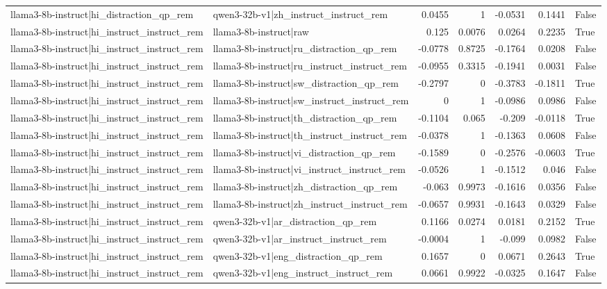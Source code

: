 \begin{table}
\begin{tabular}{l l r r r r l}
llama3-8b-instruct|hi_distraction_qp_rem & qwen3-32b-v1|zh_instruct_instruct_rem & 0.0455 & 1 & -0.0531 & 0.1441 & False \\
llama3-8b-instruct|hi_instruct_instruct_rem & llama3-8b-instruct|raw & 0.125 & 0.0076 & 0.0264 & 0.2235 & True \\
llama3-8b-instruct|hi_instruct_instruct_rem & llama3-8b-instruct|ru_distraction_qp_rem & -0.0778 & 0.8725 & -0.1764 & 0.0208 & False \\
llama3-8b-instruct|hi_instruct_instruct_rem & llama3-8b-instruct|ru_instruct_instruct_rem & -0.0955 & 0.3315 & -0.1941 & 0.0031 & False \\
llama3-8b-instruct|hi_instruct_instruct_rem & llama3-8b-instruct|sw_distraction_qp_rem & -0.2797 & 0 & -0.3783 & -0.1811 & True \\
llama3-8b-instruct|hi_instruct_instruct_rem & llama3-8b-instruct|sw_instruct_instruct_rem & 0 & 1 & -0.0986 & 0.0986 & False \\
llama3-8b-instruct|hi_instruct_instruct_rem & llama3-8b-instruct|th_distraction_qp_rem & -0.1104 & 0.065 & -0.209 & -0.0118 & True \\
llama3-8b-instruct|hi_instruct_instruct_rem & llama3-8b-instruct|th_instruct_instruct_rem & -0.0378 & 1 & -0.1363 & 0.0608 & False \\
llama3-8b-instruct|hi_instruct_instruct_rem & llama3-8b-instruct|vi_distraction_qp_rem & -0.1589 & 0 & -0.2576 & -0.0603 & True \\
llama3-8b-instruct|hi_instruct_instruct_rem & llama3-8b-instruct|vi_instruct_instruct_rem & -0.0526 & 1 & -0.1512 & 0.046 & False \\
llama3-8b-instruct|hi_instruct_instruct_rem & llama3-8b-instruct|zh_distraction_qp_rem & -0.063 & 0.9973 & -0.1616 & 0.0356 & False \\
llama3-8b-instruct|hi_instruct_instruct_rem & llama3-8b-instruct|zh_instruct_instruct_rem & -0.0657 & 0.9931 & -0.1643 & 0.0329 & False \\
llama3-8b-instruct|hi_instruct_instruct_rem & qwen3-32b-v1|ar_distraction_qp_rem & 0.1166 & 0.0274 & 0.0181 & 0.2152 & True \\
llama3-8b-instruct|hi_instruct_instruct_rem & qwen3-32b-v1|ar_instruct_instruct_rem & -0.0004 & 1 & -0.099 & 0.0982 & False \\
llama3-8b-instruct|hi_instruct_instruct_rem & qwen3-32b-v1|eng_distraction_qp_rem & 0.1657 & 0 & 0.0671 & 0.2643 & True \\
llama3-8b-instruct|hi_instruct_instruct_rem & qwen3-32b-v1|eng_instruct_instruct_rem & 0.0661 & 0.9922 & -0.0325 & 0.1647 & False \\

\end{tabular}
\end{table}

